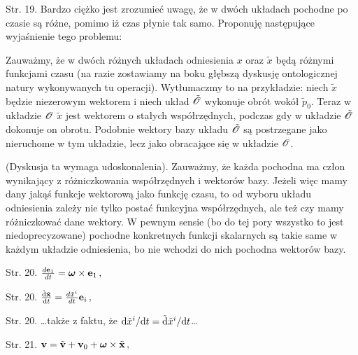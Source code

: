 \documentclass[a4paper,11pt]{article}
\begin{document}




\start {}

\vspace{\spaceFour}



\start Str. 19. Bardzo ciężko jest zrozumieć uwagę, że w dwóch układach pochodne po czasie są różne, pomimo iż czas płynie tak samo. Proponuję następujące wyjaśnienie tego problemu:

Zauważmy, że w dwóch różnych układach odniesienia $x$ oraz
$\tilde{ x }$ będą różnymi funkcjami czasu (na razie zostawiamy na
boku głębszą dyskusję ontologicznej natury wykonywanych tu operacji).
Wytłumaczmy to na przykładzie: niech $\tilde{ x }$ będzie niezerowym
wektorem i niech układ $\tilde{ \mathcal{O} }$ wykonuje obrót wokół
$\tilde{ p }_{ 0 }$. Teraz w układzie $\mathcal{O}$ $\tilde{ x }$
jest wektorem o stałych współrzędnych, podczas gdy w układzie
$\tilde{ \mathcal{O} }$ dokonuje on obrotu. Podobnie wektory bazy
układu $\tilde{ \mathcal{O} }$ są postrzegane jako nieruchome w tym
układzie, lecz jako obracające się w
układzie $\mathcal{O}$.

(Dyskusja ta wymaga udoskonalenia). Zauważmy, że każda pochodna ma
człon wynikający z różniczkowania współrzędnych i wektorów bazy.
Jeżeli więc mamy dany jakąś funkcje wektorową jako funkcję czasu, to
od wyboru układu odniesienia zależy nie tylko postać funkcyjna
współrzędnych, ale też czy mamy różniczkować dane wektory. W pewnym
sensie (bo do tej pory wszystko to jest niedoprecyzowane) pochodne
konkretnych funkcji skalarnych są takie same w każdym układzie
odniesienia, bo nie wchodzi do nich pochodna wektorów bazy.



Str. 20.
$\frac{ d\mathbf{e}_{ 1 } }{ dt } = \boldsymbol{\omega} \times
\mathbf{e}_{ 1 } \, ,$

Str. 20.
$\frac{ \tilde{ \mathrm{d} } \tilde{ \mathbf{x} } }{ \mathrm{d} t }
= \frac{ d\tilde{ x }^{ i } }{ dt } \mathbf{e}_{ i } \, ,$

Str. 20. \ldots także z faktu, że
$\mathrm{d} \tilde{ x }^{ i } / \mathrm{d} t = \tilde{ \mathrm{d} } \tilde{ x
}^{ i } / \mathrm{d} t$\ldots

Str. 21.
$\mathbf{v} = \tilde{ \mathbf{v} } + \mathbf{v}_{ 0 } +
\boldsymbol{\omega} \times \tilde{ \mathbf{x} } \, ,$
\end{document}
